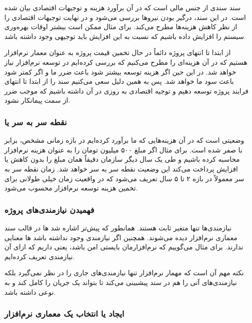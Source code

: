 سند  سندی از جنس مالی است که در آن برآورد هزینه و توجیهات
اقتصادی بیان شده است. در این سند، درگیر بودن نیرو‌ها بررسی می‌شود و در نهایت
توجیهات‌ اقتصادی را از نظر کاهش هزینه‌ها مطرح می‌کند. برای مثال ممکن است بیشتر
اوقات بهره‌وری سیستم را افزایش داده باشیم که نسبت به این افزایش باید توجیهی وجود
داشته باشد.

از ابتدا تا انتهای پروژه دائماً در حال تخمین قیمت پروژه به عنوان معمار نرم‌افزار
هستیم که در آن هزینه‌ای را مطرح می‌کنیم که بررسی کرده‌ایم در توسعه نرم‌افزار
نیاز خواهد شد. در این حین اگر هزینه توسعه بیشتر شود باعث ضرر ما و اگر کمتر شود
باعث سود ما خواهد شد. پس به همین دلیل سعی می‌کنیم سند  را از
ابتدا تا انتهای فرایند پروژه توسعه دهیم و توجیه اقتصادی به روزی در آن داشته
باشیم که موجب ضرر از سمت پیمانکار نشود.

\subsubsection*{نقطه سر به سر یا }

وضعیتی است که در آن هزینه‌هایی که ما برآورد کرده‌ایم در بازه زمانی مشخص، برابر
با صفر شده است. برای مثال اگر مبلغ ۵۰۰ میلیون تومان را به عنوان هزینه نرم‌افزار
محاسبه کرده باشیم و طی یک سال دیگر سازمان دقیقاً همان مبلغ را بدون کاهش یا
افزایش پرداخت می‌کند این وضعیت نقطه سر به سر خواهد شد. زمان نقطه سر به سر
معمولاً در بازه ۲ تا ۵ سال تعریف می‌شود که در واقعیت زمان خیلی طولانی برای تخمین
هزینه توسعه نرم‌افزار محسوب می‌شود.

\subsubsection{فهمیدن نیازمندی‌های پروژه}

نیازمندی‌ها تنها متغیر ثابت هستند. همانطور که پیش‌تر اشاره شد
ها در قالب سند معماری نرم‌افزار دیده می‌شوند. همچنین اگر
نیازمندی  وجود نداشته باشد ها معنایی ندارند.
برای مثال می‌گوییم که نرم‌افزارمان بایستی امن باشد، یعنی 
داریم که ازای آن نیازمندی  تعریف کرده‌ایم.

نکته مهم آن است که مهمار نرم‌افزار تنها نیازمندی‌های جاری را در نظر نمی‌گیرد
بلکه نیازمندی‌های آتی را هم در سند پیشبینی می‌کند تا بتواند یک جریان را کامل کند
و به نوعی  داشته باشد.

\subsubsection{ایجاد یا انتخاب یک معماری نرم‌افزار}

